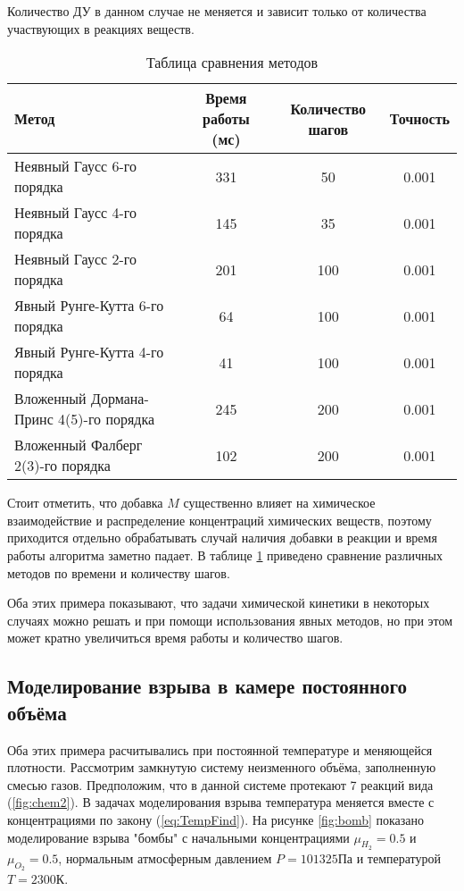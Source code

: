 Количество ДУ в данном случае не меняется и зависит только от количества участвующих в реакциях веществ.

\begin{table}    
    \caption{Таблица сравнения методов}
    \begin{tabularx}{\textwidth}{|X|c|c|c|}
    \hline
    Метод & Время работы (мс) & Количество шагов & Точность\\
    \hline
    Неявный Гаусс 6-го порядка & 331 & 50 & 0.001\\
    \hline
    Неявный Гаусс 4-го порядка & 145 & 35 & 0.001\\
    \hline
    Неявный Гаусс 2-го порядка & 201 & 100 & 0.001\\
    \hline
    Явный Рунге-Кутта 6-го порядка & 64 & 100 & 0.001\\
    \hline
    Явный Рунге-Кутта 4-го порядка & 41 & 100 & 0.001\\
    \hline
    Вложенный Дормана-Принс 4(5)-го порядка & 245 & 200 & 0.001\\
    \hline
    Вложенный Фалберг 2(3)-го порядка & 102 & 200 & 0.001\\
    \hline
    \end{tabularx}
    \label{tab:Methods2}
\end{table}

Стоит отметить, что добавка $M$ существенно влияет на химическое взаимодействие и распределение концентраций химических веществ,
поэтому приходится
отдельно обрабатывать случай наличия добавки в реакции и время работы алгоритма заметно падает.
В таблице \ref{tab:Methods2} приведено сравнение различных методов по времени и количеству шагов.

Оба этих примера показывают, что задачи химической кинетики в некоторых случаях можно решать и при помощи использования
явных методов, но при этом может кратно увеличиться время работы и количество шагов.

\subsection{Моделирование взрыва в камере постоянного объёма}

Оба этих примера расчитывались при постоянной температуре и меняющейся плотности.
Рассмотрим замкнутую систему неизменного объёма, заполненную смесью газов. Предположим, что
в данной системе протекают 7 реакций вида (\ref{fig:chem2}).
В задачах моделирования взрыва температура меняется
вместе с концентрациями по закону (\ref{eq:TempFind}). На рисунке \ref{fig:bomb} показано моделирование взрыва "бомбы" 
с начальными концентрациями
$\mu_{H_2} = 0.5$ и $\mu_{O_2} = 0.5$, нормальным атмосферным давлением $P = 101325\text{Па}$ и температурой $T = 2300\text{К}$. 

